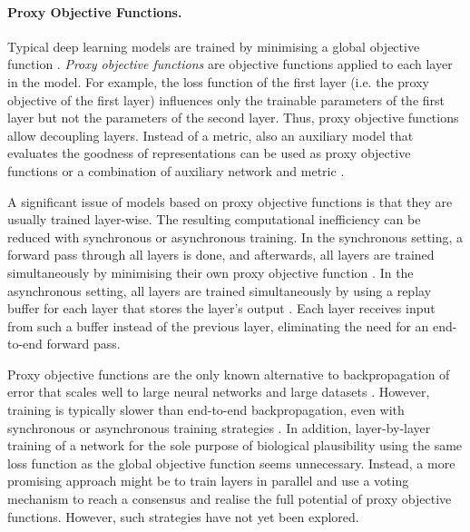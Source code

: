 \paragraph{Proxy Objective Functions.} Typical deep learning models are trained by minimising a global objective function \cite{prince_understanding_2023}. \emph{Proxy objective functions} \cite{mostafa_deep_2018, marquez_deep_2018, belilovsky_greedy_2019} are objective functions applied to each layer in the model. For example, the loss function of the first layer (i.e. the proxy objective of the first layer) influences only the trainable parameters of the first layer but not the parameters of the second layer.
Thus, proxy objective functions allow decoupling layers.
Instead of a metric, also an auxiliary model that evaluates the goodness of representations can be used as proxy objective functions \cite{duan_kernel_2020, duan_modularizing_2022, wang_revisiting_2021, belilovsky_greedy_2019, mostafa_deep_2018, marquez_deep_2018} or a combination of auxiliary network and metric .

A significant issue of models based on proxy objective functions is that they are usually trained layer-wise.
The resulting computational inefficiency can be reduced with synchronous or asynchronous training.
In the synchronous setting, a forward pass through all layers is done, and afterwards, all layers are trained simultaneously by minimising their own proxy objective function \cite{belilovsky_greedy_2019}.
In the asynchronous setting, all layers are trained simultaneously by using a replay buffer for each layer that stores the layer's output .
Each layer receives input from such a buffer instead of the previous layer, eliminating the need for an end-to-end forward pass.

Proxy objective functions are the only known alternative to backpropagation of error that scales well to large neural networks and large datasets .
However, training is typically slower than end-to-end backpropagation, even with synchronous or asynchronous training strategies  \cite{belilovsky_decoupled_2020}.
In addition, layer-by-layer training of a network for the sole purpose of biological plausibility using the same loss function as the global objective function seems unnecessary. Instead, a more promising approach might be to train layers in parallel and use a voting mechanism to reach a consensus and realise the full potential of proxy objective functions. However, such strategies have not yet been explored.

